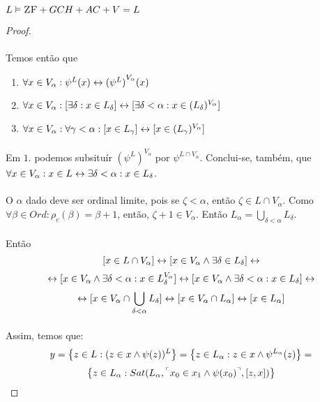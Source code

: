 \begin{theorem}{$L\vDash\text{\sc ZF}+GCH+AC+V=L$}
\begin{proof}
                \paragraph{}
                    Temos então que
                \begin{enumerate}
                    \item $\forall x\in V_\alpha: \psi^L(x) \leftrightarrow {(\psi^L)}^{V_\alpha}(x)$
                    \item $\forall x\in V_\alpha:[\exists\delta :x\in L_\delta] \leftrightarrow [\exists\delta<\alpha :x\in (L_\delta)^{V_\alpha}]$
                    \item $\forall x\in V_\alpha: \forall\gamma<\alpha: [x\in L_\gamma] \leftrightarrow [x\in (L_\gamma)^{V_\alpha}]$
                \end{enumerate}
                \paragraph{}
                    Em $1.$ podemos subsituír ${(\psi^L)}^{V_\alpha}$ por $\psi^{L\cap V_\alpha}$. Conclui-se, também, que 
                    $\forall x\in V_\alpha:x\in L\leftrightarrow\exists\delta<\alpha:x\in L_\delta$.
                \paragraph{}
                    O $\alpha$ dado deve ser ordinal limite, pois se $\zeta<\alpha$, então $\zeta\in L\cap V_\alpha$. Como $\forall\beta\in 
                    Ord:\rho_c(\beta) = \beta+1$, então, $\zeta+1\in V_\alpha$. Então $L_\alpha = \bigcup_{\delta < \alpha}L_\delta$.
                \paragraph{}
                    Então 
                    $$
                            [x\in L\cap V_\alpha]\leftrightarrow[x\in V_\alpha\land\exists\delta\in L_\delta]\leftrightarrow
                    $$ $$
                        \leftrightarrow[x\in V_\alpha\land\exists\delta<\alpha:x\in L_\delta^{V_\alpha}]\leftrightarrow[x\in V_\alpha\land\exists\delta<\alpha:x\in L_\delta]\leftrightarrow
                    $$ $$
                        \leftrightarrow[x\in V_\alpha\cap\bigcup_{\delta<\alpha}L_\delta]\leftrightarrow[x\in V_\alpha\cap L_\alpha]\leftrightarrow[x\in L_\alpha]
                    $$
                \paragraph{}
                    Assim, temos que:
                    $$y=\SET{z\in L:(z\in x\land\psi(z))^L} = \SET{z\in L_\alpha:z\in x\land\psi^{L_\alpha}(z)} =$$
                    $$\SET{z\in L_\alpha:Sat(L_\alpha, \FMLA{x_0\in x_1\land\psi(x_0)},[z, x])}$$

\end{proof}
\end{theorem}
